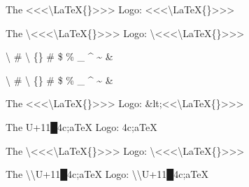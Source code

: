 
The <<<\textbackslash{}LaTeX\{\}>>> Logo: {\mktsStyleCode{}<<<\textbackslash{}LaTeX\{\}>>>}\mktsShowpar\par
The \textbackslash{}<<<\textbackslash{}LaTeX\{\}>>> Logo: {\mktsStyleCode{}\textbackslash{}<<<\textbackslash{}LaTeX\{\}>>>}\mktsShowpar\par
\textbackslash{} \# \textbackslash{} \{\} \# \$ \% \_ \textasciicircum{} \textasciitilde{} \&\mktsShowpar\par
{\mktsStyleCode{}\textbackslash{} \# \textbackslash{} \{\} \# \$ \% \_ \textasciicircum{} \textasciitilde{} \&}\mktsShowpar\par
The <<<\textbackslash{}LaTeX\{\}>>> Logo: {\mktsStyleCode{}\&lt;<<\textbackslash{}LaTeX\{\}>>>}\mktsShowpar\par
The {\mktsStyleBold\color{red}{%
\mktsStyleSymbol█}U+11{\mktsStyleSymbol█}}4c;aTeX{} Logo: {4c;aTeX{}}\mktsShowpar\par
The \textbackslash{}<<<\textbackslash{}LaTeX\{\}>>> Logo: {\mktsStyleCode{}\textbackslash{}<<<\textbackslash{}LaTeX\{\}>>>}\mktsShowpar\par
The \textbackslash{}\textbackslash{}{\mktsStyleBold\color{red}{%
\mktsStyleSymbol█}U+11{\mktsStyleSymbol█}}4c;aTeX{} Logo: {\mktsStyleCode{}\textbackslash{}\textbackslash{}{\mktsStyleBold\color{red}{%
\mktsStyleSymbol█}U+11{\mktsStyleSymbol█}}4c;aTeX{}}\mktsShowpar\par

